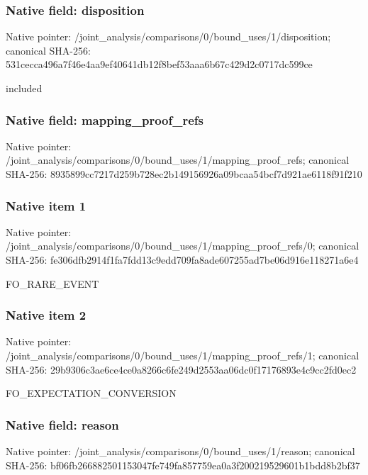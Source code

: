 \documentclass[10pt,a4paper]{article}
\begin{document}
\subsubsection{Native field: disposition}


Native pointer: /joint\_analysis/comparis\allowbreak{}ons/0/bound\_uses/1/dispo\allowbreak{}sition; canonical SHA-256: 531cecca496a7f46e4aa9ef4\allowbreak{}0641db12f8bef53aaa6b67c4\allowbreak{}29d2c0717dc599ce


included


\subsubsection{Native field: mapping\_proof\_refs}


Native pointer: /joint\_analysis/comparis\allowbreak{}ons/0/bound\_uses/1/mappi\allowbreak{}ng\_proof\_refs; canonical SHA-256: 8935899cc7217d259b728ec2\allowbreak{}b149156926a09bcaa54bcf7d\allowbreak{}921ae6118f91f210



\subsubsection{Native item 1}


Native pointer: /joint\_analysis/comparis\allowbreak{}ons/0/bound\_uses/1/mappi\allowbreak{}ng\_proof\_refs/0; canonical SHA-256: fe306dfb2914f1fa7fdd13c9\allowbreak{}edd709fa8ade607255ad7be0\allowbreak{}6d916e118271a6e4


FO\_RARE\_EVENT


\subsubsection{Native item 2}


Native pointer: /joint\_analysis/comparis\allowbreak{}ons/0/bound\_uses/1/mappi\allowbreak{}ng\_proof\_refs/1; canonical SHA-256: 29b9306c3ae6ce4ce0a8266c\allowbreak{}6fe249d2553aa06dc0f17176\allowbreak{}893e4c9cc2fd0ec2


FO\_EXPECTATION\_CONVERSION


\subsubsection{Native field: reason}


Native pointer: /joint\_analysis/comparis\allowbreak{}ons/0/bound\_uses/1/reaso\allowbreak{}n; canonical SHA-256: bf06fb266882501153047fe7\allowbreak{}49fa857759ea0a3f20021952\allowbreak{}9601b1bdd8b2bf37
\end{document}
